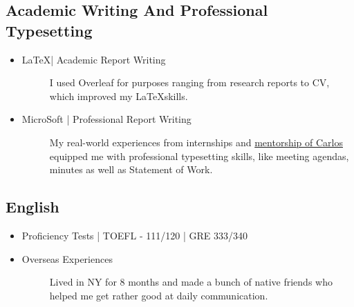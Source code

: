 \documentclass[a4paper]{article}
\begin{document}
\subsection{Academic Writing And Professional Typesetting}
\begin{itemize}
    \item\begin{description}
        \item[\LaTeX | Academic Report Writing] 
        I used Overleaf for purposes ranging from research reports to CV, which improved my \LaTeX skills.
    \end{description}
    \item\begin{description}
        \item[MicroSoft | Professional Report Writing] 
        My real-world experiences from internships and \hyperlink{integrated}{mentorship of Carlos} equipped me with professional typesetting skills, like meeting agendas, minutes as well as Statement of Work.
    \end{description}
\end{itemize}

\subsection{English}
\begin{itemize}
    \item \begin{description}
        \item[Proficiency Tests | TOEFL - 111/120 | GRE 333/340]  
    \end{description}
    \item \begin{description}
        \item[Overseas Experiences] Lived in NY for 8 months and made a bunch of native friends who helped me get rather good at daily communication.
    \end{description}
\end{itemize}
\end{document}
